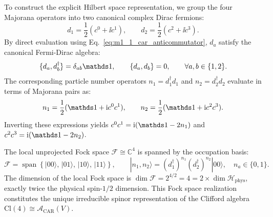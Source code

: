 To construct the explicit Hilbert space representation, we group the four Majorana operators into two canonical complex Dirac fermions:
\begin{equation}
\label{eq:m1_1_dirac_fermions}
d_1 = \frac{1}{2}(c^0 + \ii c^1), \qquad d_2 = \frac{1}{2}(c^2 + \ii c^3).
\end{equation}
By direct evaluation using Eq.~\eqref{eq:m1_1_car_anticommutator}, $d_a$ satisfy the canonical Fermi-Dirac algebra:
\begin{equation}
\label{eq:m1_1_dirac_algebra}
\{d_a, d_b^\dagger\} = \delta_{ab}\Id, \qquad \{d_a, d_b\} = 0, \qquad \forall a, b \in \{1, 2\}.
\end{equation}
The corresponding particle number operators $n_1 = d_1^\dagger d_1$ and $n_2 = d_2^\dagger d_2$ evaluate in terms of Majorana pairs as:
\begin{equation}
\label{eq:m1_1_number_operators_majorana}
n_1 = \frac{1}{2}(\Id + \ii c^0 c^1), \qquad n_2 = \frac{1}{2}(\Id + \ii c^2 c^3).
\end{equation}
Inverting these expressions yields $c^0 c^1 = \ii(\Id - 2n_1)$ and $c^2 c^3 = \ii(\Id - 2n_2)$.

The local unprojected Fock space $\mathcal{F} \cong \mathbb{C}^4$ is spanned by the occupation basis:
\begin{equation}
\label{eq:m1_1_fock_basis}
\mathcal{F} = \operatorname{span}\left\{ |00\rangle, \, |01\rangle, \, |10\rangle, \, |11\rangle \right\}, \qquad |n_1, n_2\rangle = (d_1^\dagger)^{n_1} (d_2^\dagger)^{n_2} |00\rangle, \quad n_a \in \{0, 1\}.
\end{equation}
The dimension of the local Fock space is $\dim \mathcal{F} = 2^{4/2} = 4 = 2 \times \dim \mathcal{H}_{\mathrm{phys}}$, exactly twice the physical spin-$1/2$ dimension. This Fock space realization constitutes the unique irreducible spinor representation of the Clifford algebra $\mathrm{Cl}(4) \cong \mathcal{A}_{\mathrm{CAR}}(V)$.

